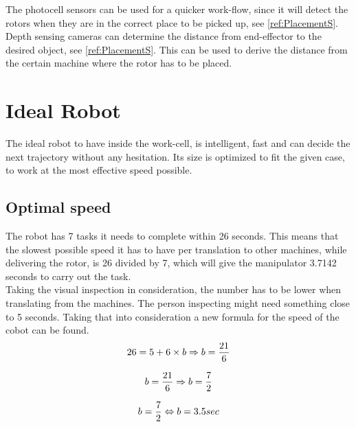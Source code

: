 The photocell sensors can be used for a quicker work-flow, since it will detect the rotors when they are in the correct place to be picked up, see \ref{ref:PlacementS}.\\

Depth sensing cameras can determine the distance from end-effector to the desired object, see \ref{ref:PlacementS}. This can be used to derive the distance from the certain machine where the rotor has to be placed.\\

\chapter{Ideal Robot}\label{IdealRobot}

The ideal robot to have inside the work-cell, is intelligent, fast and can decide the next trajectory without any hesitation. Its size is optimized to fit the given case, to work at the most effective speed possible.\\

\section{Optimal speed}

The robot has 7 tasks it needs to complete within 26 seconds. This means that the slowest possible speed it has to have per translation to other machines, while delivering the rotor, is 26 divided by 7, which will give the manipulator 3.7142 seconds to carry out the task.\\
Taking the visual inspection in consideration, the number has to be lower when translating from the machines. The person inspecting might need something close to 5 seconds. Taking that into consideration a new formula for the speed of the cobot can be found.\\

\begin{equation}
    26 = 5 + 6 \times b \Rightarrow b = \frac{21}{6}\\
\end{equation}

\begin{equation}
    b = \frac{21}{6} \Rightarrow b = \frac{7}{2}\\
\end{equation}

\begin{equation}
    b = \frac{7}{2} \Leftrightarrow  b = 3.5 sec\\
\end{equation}

